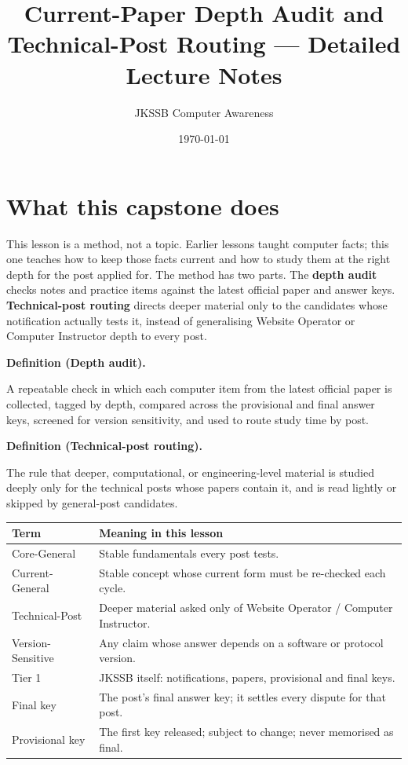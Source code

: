 \documentclass[11pt]{article}
\title{Current-Paper Depth Audit and Technical-Post Routing --- Detailed Lecture Notes}
\author{JKSSB Computer Awareness}
\date{\today}
\newenvironment{definitionbox}[1]{%
  \par\noindent\textbf{Definition (#1).}\ \itshape
}{\par\vspace{0.3em}}
\begin{document}
\maketitle

\section{What this capstone does}

This lesson is a method, not a topic. Earlier lessons taught computer facts;
this one teaches how to keep those facts current and how to study them at the
right depth for the post applied for. The method has two parts. The
\textbf{depth audit} checks notes and practice items against the latest
official paper and answer keys. \textbf{Technical-post routing} directs deeper
material only to the candidates whose notification actually tests it, instead
of generalising Website Operator or Computer Instructor depth to every post.

\begin{definitionbox}{Depth audit}
A repeatable check in which each computer item from the latest official paper
is collected, tagged by depth, compared across the provisional and final
answer keys, screened for version sensitivity, and used to route study time by
post.
\end{definitionbox}

\begin{definitionbox}{Technical-post routing}
The rule that deeper, computational, or engineering-level material is studied
deeply only for the technical posts whose papers contain it, and is read
lightly or skipped by general-post candidates.
\end{definitionbox}

\begin{center}
\begin{tabular}{p{}p{}}
\toprule
\textbf{Term} & \textbf{Meaning in this lesson} \\
\midrule
Core-General & Stable fundamentals every post tests. \\
Current-General & Stable concept whose current form must be re-checked each cycle. \\
Technical-Post & Deeper material asked only of Website Operator / Computer Instructor. \\
Version-Sensitive & Any claim whose answer depends on a software or protocol version. \\
Tier 1 & JKSSB itself: notifications, papers, provisional and final keys. \\
Final key & The post's final answer key; it settles every dispute for that post. \\
Provisional key & The first key released; subject to change; never memorised as final. \\
\bottomrule
\end{tabular}
\end{center}
\end{document}
